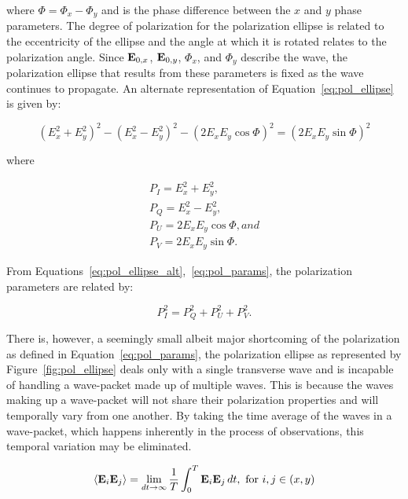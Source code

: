 \noindent where $\Phi = \Phi_{x} - \Phi_{y}$ and is the phase difference between the $x$ and $y$ phase parameters. The degree of polarization for the polarization ellipse is related to the eccentricity of the ellipse and the angle at which it is rotated relates to the polarization angle. Since $\mathbf{E}_{0, x}$, $\mathbf{E}_{0, y}$, $\Phi_{x}$, and $\Phi_{y}$ describe the wave, the polarization ellipse that results from these parameters is fixed as the wave continues to propagate. An alternate representation of Equation~\ref{eq:pol_ellipse} is given by:

\begin{equation}
    (E_{x}^{2} + E_{y}^{2})^{2} - (E_{x}^{2} - E_{y}^{2})^{2} - (2 E_{x} E_{y} \cos \Phi)^{2} = (2 E_{x} E_{y} \sin \Phi)^{2}
    \label{eq:pol_ellipse_alt}
\end{equation}

\noindent where

\begin{equation}
    \begin{gathered}
        P_{I} = E_{x}^{2} + E_{y}^{2}, \\
        P_{Q} = E_{x}^{2} - E_{y}^{2}, \\
        P_{U} = 2 E_{x} E_{y} \cos \Phi, and \\
        P_{V} = 2 E_{x} E_{y} \sin \Phi.
    \end{gathered}
    \label{eq:pol_params}
\end{equation}

From Equations~\ref{eq:pol_ellipse_alt},~\ref{eq:pol_params}, the polarization parameters are related by:

\begin{equation}
    P_{I}^{2} = P_{Q}^{2} + P_{U}^{2} + P_{V}^{2}.
\end{equation}

There is, however, a seemingly small albeit major shortcoming of the polarization as defined in Equation~\ref{eq:pol_params}, the polarization ellipse as represented by Figure~\ref{fig:pol_ellipse} deals only with a single transverse wave and is incapable of handling a wave-packet made up of multiple waves. This is because the waves making up a wave-packet will not share their polarization properties and will temporally vary from one another. By taking the time average of the waves in a wave-packet, which happens inherently in the process of observations, this temporal variation may be eliminated.

\begin{equation}
    \left< \mathbf{E}_{i} \mathbf{E}_{j} \right> = \lim_{dt \rightarrow \infty} \frac{1}{T} \int_{0}^{T} \mathbf{E}_{i} \mathbf{E}_{j}\,dt, \text{ for } i, j \in (x, y)
\end{equation}

